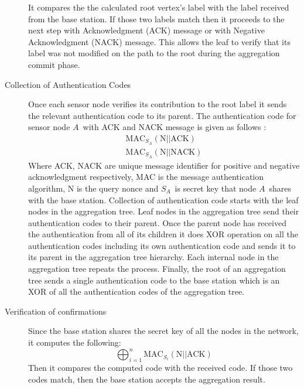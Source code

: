 \begin{description}
			It compares the the calculated root vertex's label with the label received from the base station.
			If those two labels match then it proceeds to the next step with Acknowledgment (ACK) message or with Negative Acknowledgment (NACK) message.
			This allows the leaf to verify that its label was not modified on the path to the root during the aggregation commit phase.
		\item[Collection of Authentication Codes] 
			Once each sensor node verifies its contribution to the root label it sends the relevant authentication code to its parent.
			The authentication code for sensor node $A$\ with ACK and NACK message is given as follows :
			\begin{equation}
				\begin{array}{l}
					\mbox{MAC}_{S_{A}}( \mbox{N} || \mbox{ACK})\\
					\mbox{MAC}_{S_{A}}( \mbox{N} || \mbox{NACK})	
				\end{array}
			\end{equation}
			Where ACK, NACK are unique message identifier for positive and negative acknowledgment respectively, 
			MAC is  the message authentication algorithm, 
			N is the query nonce and $S_{A}$\ is secret key that node $A$\ shares with the base station.
			Collection of authentication code starts with the leaf nodes in the aggregation tree.
			Leaf nodes in the aggregation tree send their authentication codes to their parent.
			Once the parent node has received the authentication from all of its children it does XOR operation on all the authentication codes including its own authentication code and sends it to its parent in the aggregation tree hierarchy.
			Each internal node in the aggregation tree repeats the process.
			Finally, the root of an aggregation tree sends a single authentication code to the base station which is an XOR of all the authentication codes of the aggregation tree.  
		\item[Verification of confirmations]
			Since the base station shares the secret key of all the nodes in the network, it computes the following:
			\begin{equation}
				\bigoplus_{i = 1}^n \mbox{MAC}_{S_{i}}(\mbox{N} || \mbox{ACK})
			\end{equation}
			Then it compares the computed code with the received code. 
			If those two codes match, then the base station accepts the aggregation result.
	\end{description}

